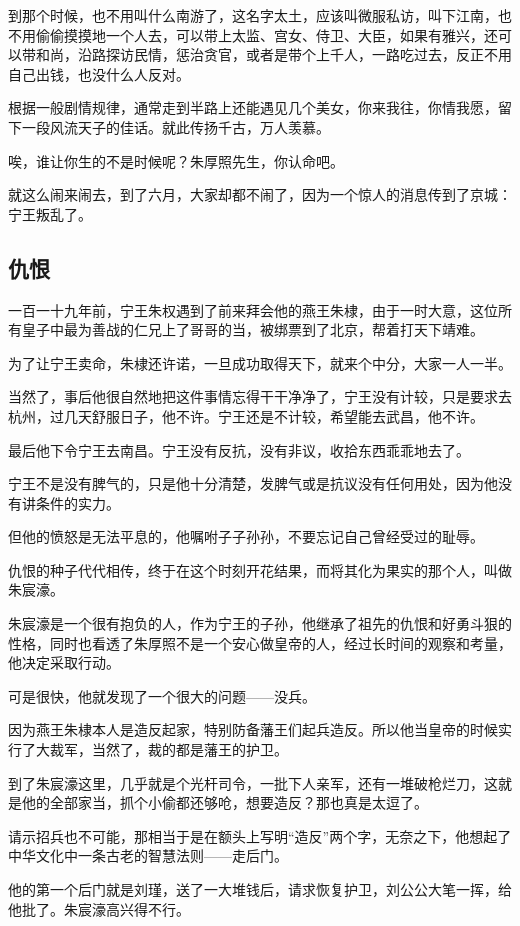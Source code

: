 \begin{multicols}{\theparacolNo}
		到那个时候，也不用叫什么南游了，这名字太土，应该叫微服私访，叫下江南，也不用偷偷摸摸地一个人去，可以带上太监、宫女、侍卫、大臣，如果有雅兴，还可以带和尚，沿路探访民情，惩治贪官，或者是带个上千人，一路吃过去，反正不用自己出钱，也没什么人反对。

		根据一般剧情规律，通常走到半路上还能遇见几个美女，你来我往，你情我愿，留下一段风流天子的佳话。就此传扬千古，万人羡慕。

		唉，谁让你生的不是时候呢？朱厚照先生，你认命吧。

		就这么闹来闹去，到了六月，大家却都不闹了，因为一个惊人的消息传到了京城：宁王叛乱了。

		\subsection{仇恨}
		一百一十九年前，宁王朱权遇到了前来拜会他的燕王朱棣，由于一时大意，这位所有皇子中最为善战的仁兄上了哥哥的当，被绑票到了北京，帮着打天下靖难。

		为了让宁王卖命，朱棣还许诺，一旦成功取得天下，就来个中分，大家一人一半。

		当然了，事后他很自然地把这件事情忘得干干净净了，宁王没有计较，只是要求去杭州，过几天舒服日子，他不许。宁王还是不计较，希望能去武昌，他不许。

		最后他下令宁王去南昌。宁王没有反抗，没有非议，收拾东西乖乖地去了。

		宁王不是没有脾气的，只是他十分清楚，发脾气或是抗议没有任何用处，因为他没有讲条件的实力。

		但他的愤怒是无法平息的，他嘱咐子子孙孙，不要忘记自己曾经受过的耻辱。

		仇恨的种子代代相传，终于在这个时刻开花结果，而将其化为果实的那个人，叫做朱宸濠。

		朱宸濠是一个很有抱负的人，作为宁王的子孙，他继承了祖先的仇恨和好勇斗狠的性格，同时也看透了朱厚照不是一个安心做皇帝的人，经过长时间的观察和考量，他决定采取行动。

		可是很快，他就发现了一个很大的问题——没兵。

		因为燕王朱棣本人是造反起家，特别防备藩王们起兵造反。所以他当皇帝的时候实行了大裁军，当然了，裁的都是藩王的护卫。

		到了朱宸濠这里，几乎就是个光杆司令，一批下人亲军，还有一堆破枪烂刀，这就是他的全部家当，抓个小偷都还够呛，想要造反？那也真是太逗了。

		请示招兵也不可能，那相当于是在额头上写明“造反”两个字，无奈之下，他想起了中华文化中一条古老的智慧法则——走后门。

		他的第一个后门就是刘瑾，送了一大堆钱后，请求恢复护卫，刘公公大笔一挥，给他批了。朱宸濠高兴得不行。


\end{multicols}
